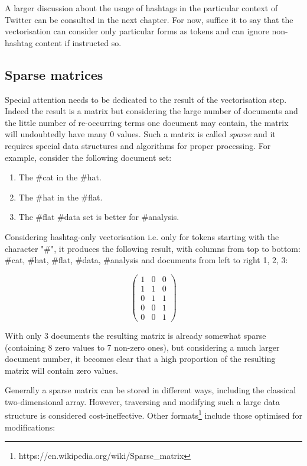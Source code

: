A larger discussion about the usage of hashtags in the particular context of Twitter can be consulted in the next chapter. For now, suffice it to say that the vectorisation can consider only particular forms as tokens and can ignore non-hashtag content if instructed so.

\subsection{Sparse matrices}
Special attention needs to be dedicated to the result of the vectorisation step. Indeed the result is a matrix but considering the large number of documents and the little number of re-occurring terms one document may contain, the matrix will undoubtedly have many 0 values. Such a matrix is called \emph{sparse} and it requires special data structures and algorithms for proper processing. For example, consider the following document set:

\begin{enumerate}
\item The \#cat in the \#hat.
\item The \#hat in the \#flat.
\item The \#flat \#data set is better for \#analysis.
\end{enumerate}

Considering hashtag-only vectorisation i.e. only for tokens starting with the character "\#", it produces the following result, with columns from top to bottom: \#cat, \#hat, \#flat, \#data, \#analysis and documents from left to right 1, 2, 3:

\[ \left( \begin{array}{ccc}
1 & 0 & 0 \\
1 & 1 & 0 \\
0 & 1 & 1 \\
0 & 0 & 1 \\
0 & 0 & 1 \end{array} \right)\] 

With only 3 documents the resulting matrix is already somewhat sparse (containing 8 zero values to 7 non-zero ones), but considering a much larger document number, it becomes clear that a high proportion of the resulting matrix will contain zero values.

Generally a sparse matrix can be stored in different ways, including the classical two-dimensional array. However, traversing and modifying such a large data structure is considered cost-ineffective. Other formats\footnote{https://en.wikipedia.org/wiki/Sparse\_matrix} include those optimised for modifications:

